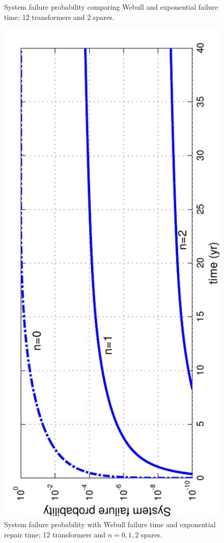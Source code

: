 \documentclass[letterpaper, 12pt]{article}
\begin{document}
\begin{figure}[h!]
  \caption{System failure probability comparing Webull and exponential failure time; 12 transformers and 2 spares.\label{fig:CompareWblExp}} 
\end{figure}

\begin{figure}[h!] \centering
  \includegraphics[scale=0.8, angle=-90]{WblFailureProb}
  \caption{System failure probability with Webull failure time and exponential repair time; 12 transformers and $n=0,1,2$ spares.\label{fig:WblFailureProb}} 
\end{figure}
\end{document}
